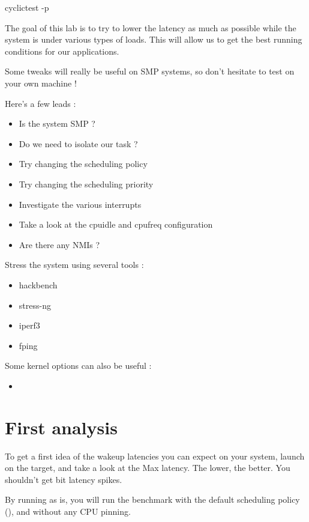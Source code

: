 \begin{bashinput}
cyclictest -p 
\end{bashinput}

The goal of this lab is to try to lower the latency as much as possible while
the system is under various types of loads. This will allow us to get the
best running conditions for our applications.

Some tweaks will really be useful on SMP systems, so don't hesitate to test on
your own machine !

Here's a few leads :

\begin{itemize}
	\item Is the system SMP ?
	\item Do we need to isolate our task ?
	\item Try changing the scheduling policy
	\item Try changing the scheduling priority
	\item Investigate the various interrupts
	\item Take a look at the cpuidle and cpufreq configuration
	\item Are there any NMIs ?
\end{itemize}

Stress the system using several tools :

\begin{itemize}
	\item hackbench
	\item stress-ng
	\item iperf3
	\item fping
\end{itemize}

Some kernel options can also be useful :

\begin{itemize}
	\item {}
\end{itemize}

\section{First analysis}

To get a first idea of the wakeup latencies you can expect on your system, launch
 on the target, and take a look at the Max latency. The lower, the
better. You shouldn't get bit latency spikes.

By running  as is, you will run the benchmark with the default
scheduling policy (), and without any CPU pinning.

